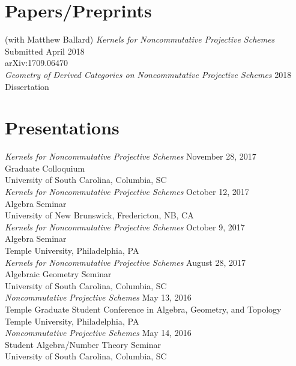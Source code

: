 \documentclass{article}
\begin{document}
  \newpage
  \section*{Papers/Preprints}
  (with Matthew Ballard) \textsl{Kernels for Noncommutative Projective Schemes} \hfill Submitted April 2018\\
  arXiv:1709.06470\\
    
  \noindent\textsl{Geometry of Derived Categories on Noncommutative Projective Schemes} \hfill 2018\\
  Dissertation

  \section*{Presentations}
  \textsl{Kernels for Noncommutative Projective Schemes} \hfill November 28, 2017\\
  Graduate Colloquium\\
  University of South Carolina, Columbia, SC\\
  
  \noindent \textsl{Kernels for Noncommutative Projective Schemes} \hfill October 12, 2017\\
  Algebra Seminar\\
  University of New Brunswick, Fredericton, NB, CA\\
  
  \noindent\textsl{Kernels for Noncommutative Projective Schemes} \hfill October 9, 2017\\
  Algebra Seminar\\
  Temple University, Philadelphia, PA\\
  
  \noindent\textsl{Kernels for Noncommutative Projective Schemes} \hfill August 28, 2017\\
  Algebraic Geometry Seminar\\
  University of South Carolina, Columbia, SC\\
  
  \noindent\textsl{Noncommutative Projective Schemes} \hfill May 13, 2016\\
  Temple Graduate Student Conference in Algebra, Geometry, and Topology\\
  Temple University, Philadelphia, PA\\

  \noindent\textsl{Noncommutative Projective Schemes} \hfill May 14, 2016\\
  Student Algebra/Number Theory Seminar\\
  University of South Carolina, Columbia, SC\\
\end{document}
